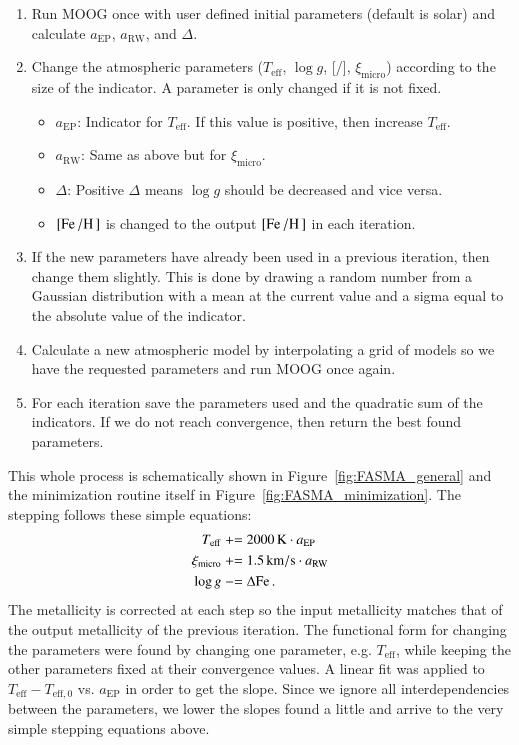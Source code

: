 \documentclass{aa}
\newcommand{\pluseq}{\mathrel{+}=}
\newcommand{\minuseq}{\mathrel{-}=}
\begin{document}
\begin{enumerate}
    \item Run MOOG once with user defined initial parameters (default is
          solar) and calculate $a_\mathrm{EP}$, $a_\mathrm{RW}$, and
          $\Delta$.
    \item Change the atmospheric parameters ($T_\mathrm{eff}$, $\log g$,
          [/], $\xi_\mathrm{micro}$) according to the size of the
          indicator. A parameter is only changed if it is not fixed.
    \begin{itemize}
        \item $a_\mathrm{EP}$: Indicator for $T_\mathrm{eff}$. If this value
              is positive, then increase $T_\mathrm{eff}$.
        \item $a_\mathrm{RW}$: Same as above but for $\xi_\mathrm{micro}$.
        \item $\Delta$: Positive $\Delta$ means $\log g$
              should be decreased and vice versa.
        \item $[\ion{Fe}{}/\ion{H}{}]$ is changed to the output
              $[\ion{Fe}{}/\ion{H}{}]$ in each iteration.
    \end{itemize}
    \item If the new parameters have already been used in a previous iteration,
          then change them slightly. This is done by drawing a random number
          from a Gaussian distribution with a mean at the current value and a
          sigma equal to the absolute value of the indicator.
    \item Calculate a new atmospheric model by interpolating a grid of models
          so we have the requested parameters and run MOOG once again.
    \item For each iteration save the parameters used and the quadratic sum of
          the indicators. If we do not reach convergence, then return the best
          found parameters.
\end{enumerate}
This whole process is schematically shown in Figure~\ref{fig:FASMA_general} and
the minimization routine itself in Figure~\ref{fig:FASMA_minimization}. The
stepping follows these simple equations:
\begin{align}
    T_\mathrm{eff}     &\pluseq \SI{2000}{K} \cdot a_\mathrm{EP}   \\
    \xi_\mathrm{micro} &\pluseq \SI{1.5}{km/s} \cdot a_\mathrm{RW} \\
    \log g             &\minuseq \Delta\ion{Fe}.
\end{align}
The metallicity is corrected at each step so the input metallicity matches that
of the output metallicity of the previous iteration. The functional form for
changing the parameters were found by changing one parameter, e.g.
$T_\mathrm{eff}$, while keeping the other parameters fixed at their convergence
values. A linear fit was applied to $T_\mathrm{eff} - T_\mathrm{eff,0}$ vs.
$a_\mathrm{EP}$ in order to get the slope. Since we ignore all interdependencies
between the parameters, we lower the slopes found a little and arrive to the
very simple stepping equations above.
\end{document}
